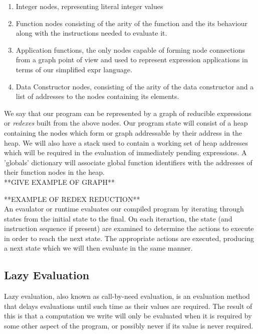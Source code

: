 \begin{enumerate}
	\item Integer nodes, representing literal integer values
	\item Function nodes consisting of the arity of the function and the
		  its behaviour along with the instructions needed to evaluate it.
	\item Application functions, the only nodes capable of forming 
		  node connections from a graph point of view and used to represent
		  expression applications in terms of our simplified expr language.
	\item Data Constructor nodes, consisting of the arity of the data
		  constructor and a list of addresses to the nodes containing its
		  elements.
\end{enumerate}

We say that our program can be represented by a graph of reducible expressions
or \emph{redexes} built from the above nodes. 
Our program state will consist of a heap containing the nodes which form
or graph addressable by their address in the heap. We will
also have a stack used to contain a working set of heap addresses which 
will be required in the evaluation of immediately pending expressions. A 
'globals' dictionary will associate global function identifiers with the
addresses of their function nodes in the heap. \\

**GIVE EXAMPLE OF GRAPH**

**EXAMPLE OF REDEX REDUCTION** \\

An evaulator or runtime evaluates our compiled program by iterating through
states from the initial state to the final. On each iterartion, the state
(and instruction sequence if present) are examined to determine the actions
to execute in order to reach the next state. The appropriate actions are
executed, producing a next state which we will then evaluate in the same
manner. 

\subsection{Lazy Evaluation}
Lazy evaluation, also known as call-by-need evaluation, is an evaluation method
that delays evaluations until such time as their values are
required. The result of this is that a computation we write will only be 
evaluated when it is required by some other aspect of the program, or possibly never
if its value is never required. 

